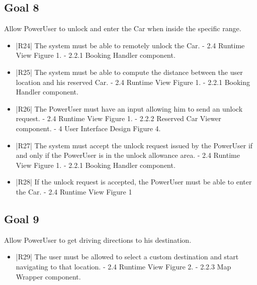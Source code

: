 \subsection {Goal 8} Allow PowerUser to unlock and enter the Car when inside the specific range.
\begin{itemize}
 \item |R24| The system must be able to remotely unlock the Car.
    \newline - 2.4 Runtime View Figure 1.
    \newline - 2.2.1 Booking Handler component.
 \item |R25| The system must be able to compute the distance between the user location
and his reserved Car.
    \newline - 2.4 Runtime View Figure 1.
    \newline - 2.2.1 Booking Handler component.
 \item |R26| The PowerUser must have an input allowing him to send an unlock request.
    \newline - 2.4 Runtime View Figure 1.
    \newline - 2.2.2 Reserved Car Viewer component.
    \newline - 4 User Interface Design Figure 4.
 \item |R27| The system must accept the unlock request issued by the PowerUser if and
only if the PowerUser is in the unlock allowance area.
    \newline - 2.4 Runtime View Figure 1.
    \newline - 2.2.1 Booking Handler component.
 \item |R28| If the unlock request is accepted, the PowerUser must be able to enter the
Car.
\newline - 2.4 Runtime View Figure 1
\end{itemize}

\subsection {Goal 9} Allow PowerUser to get driving directions to his destination.
\begin{itemize} 
 \item |R29| The user must be allowed to select a custom destination and start navigating
to that location.
    \newline - 2.4 Runtime View Figure 2.
    \newline - 2.2.3 Map Wrapper component.
\end{itemize}

